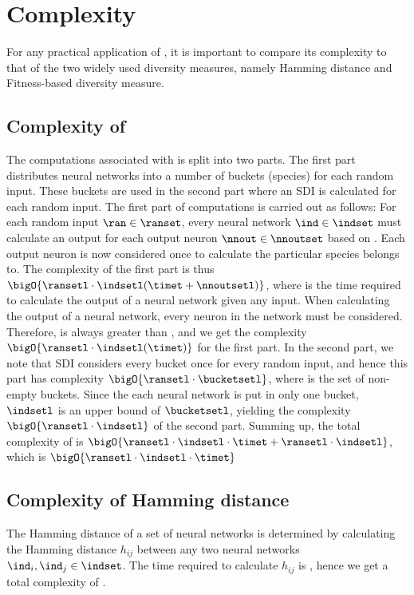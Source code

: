 \section{Complexity}\label{sec:complexity}
For any practical application of \dia{}, it is important to compare its complexity to that of the two widely used diversity measures, namely Hamming distance and Fitness-based diversity measure.

\subsection{Complexity of \dia}
The computations associated with \dia{} is split into two parts. The first part distributes neural networks into a number of buckets (species) for each random input. These buckets are used in the second part where an SDI is calculated for each random input. 
The first part of computations is carried out as follows:
For each random input $\ran \in \ranset$, every neural network $\ind \in \indset$ must calculate an output for each output neuron $\nnout \in \nnoutset$ based on \ran. Each output neuron \nnout{} is now considered once to calculate the particular species \ind{} belongs to.
The complexity of the first part is thus $\bigO{\ransetl \cdot \indsetl(\timet+\nnoutsetl)}$, where \timet{} is the time required to calculate the output of a neural network given any input. When calculating the output of a neural network, every neuron in the network must be considered. Therefore, \timet{} is always greater than \nnoutsetl, and we get the complexity $\bigO{\ransetl \cdot \indsetl(\timet)}$ for the first part.
In the second part, we note that SDI considers every bucket once for every random input, and hence this part has complexity
$\bigO{\ransetl\cdot\bucketsetl}$, where \bucketset{} is the set of non-empty buckets. Since the each neural network is put in only one bucket, $\indsetl$ is an upper bound of $\bucketsetl$, yielding the complexity $\bigO{\ransetl\cdot\indsetl}$ of the second part.
Summing up, the total complexity of \dia{} is $\bigO{\ransetl \cdot \indsetl \cdot \timet + \ransetl \cdot \indsetl}$, which is $\bigO{\ransetl\cdot\indsetl\cdot\timet}$

\subsection{Complexity of Hamming distance}
The Hamming distance of a set of neural networks \indset{} is determined
by calculating the Hamming distance $h_{ij}$ between any two neural networks $\ind_i, \ind_j \in \indset$.
The time required to calculate $h_{ij}$ is \bigO{\bitstringl}, hence we get a total complexity of
\bigO{\indsetl^2 \cdot \bitstringl}.

